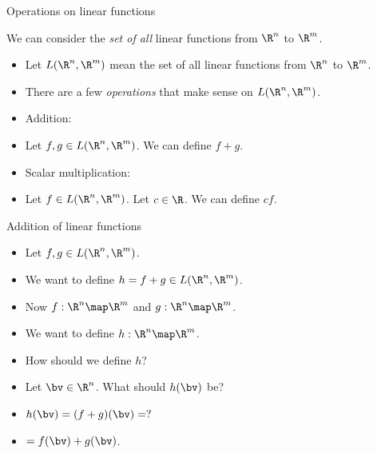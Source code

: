 \documentclass{beamer}
\begin{document}
\begin{frame}{Operations on linear functions}

We can consider the \emph{set of all} linear functions from $\R^n$ to $\R^m$.

\begin{itemize}
\item Let $L(\R^n,\R^m)$ mean the set of all linear functions from $\R^n$ to $\R^m$.
\item There are a few \emph{operations} that make sense on $L(\R^n, \R^m)$.
\item Addition:
\item Let $f, g \in L(\R^n, \R^m)$. We can define $f+g$.
\item Scalar multiplication:
\item Let $f\in L(\R^n, \R^m)$. Let $c\in\R$. We can define $cf$.
\end{itemize}

\end{frame}

\begin{frame}{Addition of linear functions}

\begin{itemize}
\item Let $f, g \in L(\R^n,\R^m)$.
\item We want to define $h = f+g \in L(\R^n,\R^m)$.
\item Now $f:\R^n\map\R^m$ and $g:\R^n\map\R^m$.
\item We want to define $h:\R^n\map\R^m$.
\item How should we define $h$?
\item Let $\bv\in\R^n$. What should $h(\bv)$ be?
\item $h(\bv) = (f+g)(\bv) = ?$
\item $=f(\bv) + g(\bv)$.
\end{itemize}

\end{frame}
\end{document}
